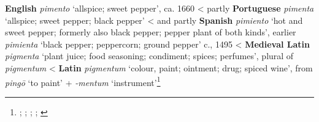 \begin{etymology}\label{ety:pimento}
\textbf{English} \textit{pimento} `allspice; sweet pepper', ca. 1660
< partly \textbf{Portuguese} \textit{pimenta} `allspice; sweet pepper; black pepper'
< and partly \textbf{Spanish} \textit{pimiento} `hot and sweet pepper; formerly also black pepper; pepper plant of both kinds', earlier \textit{pimienta} `black pepper; peppercorn; ground pepper'  c., 1495
< \textbf{Medieval Latin} \textit{pigmenta} `plant juice; food seasoning; condiment; spices; perfumes', plural of \textit{pigmentum}
< \textbf{Latin} \textit{pigmentum} `colour, paint; ointment; drug; spiced wine', from \textit{pingō} `to paint' + \textit{-mentum} `instrument'\footnote{\textcite[s.v. pimento]{oed}; \textcite[s.v. pimento]{oed}; \textcite[s.v. pimiento]{oed}; \textcites[415]{gomez_de_silva_elseviers_1985}[495]{corominas_breve_1987}; \textcite[s.v. pigmentum]{lewis_latin_1879}}
\end{etymology}
